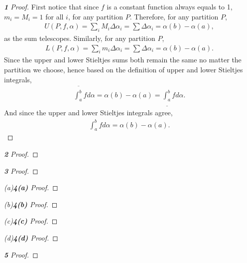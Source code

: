 \documentclass[12pt]{article}
\newenvironment{fproof}[1][]
  {\begin{proof}[\ifx\relax#1\relax\else\textbf{\large #1} Proof\fi]}
  {\end{proof}}
\begin{document}
\begin{fproof}[1]
  First notice that since \(f\) is a constant function always equals to 1, \(m_i = M_i = 1\) for all \(i\), for any partition \(P\).
  Therefore, for any partition \(P\),
  \begin{align*}
    U(P,f, \alpha) = \sum_i M_i \Delta \alpha_i = \sum \Delta \alpha_i = \alpha(b) - \alpha(a),
  \end{align*}
  as the sum telescopes.
  Similarly, for any partition \(P\),
  \begin{align*}
    L(P,f, \alpha) = \sum_i m_i \Delta \alpha_i = \sum \Delta \alpha_i = \alpha(b) - \alpha(a).
  \end{align*}
  Since the upper and lower Stieltjes sums both remain the same no matter the partition we choose, hence based on the definition of upper and lower Stieltjes integrals,
  \begin{align*}
    \overline{\int_{a}^{b}} f d \alpha = \alpha(b) - \alpha(a) = \underline{\int_{a}^{b}} f d \alpha.
  \end{align*} 
  And since the upper and lower Stieltjes integrals agree, 
  \begin{align*}
    \int_{a}^{b} f d \alpha = \alpha(b) - \alpha(a).
  \end{align*}
\end{fproof}

\newpage

\begin{fproof}[2]
\end{fproof}

\newpage

\begin{fproof}[3]
\end{fproof}

\newpage

\begin{fproof}[4(a)]
\end{fproof}

\begin{fproof}[4(b)]
\end{fproof}

\begin{fproof}[4(c)]
\end{fproof}

\begin{fproof}[4(d)]
\end{fproof}

\newpage

\begin{fproof}[5]
\end{fproof}
\end{document}
